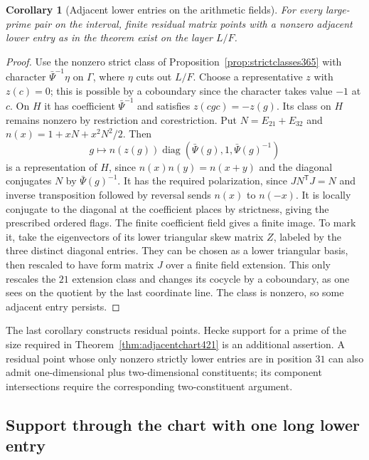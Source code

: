 \documentclass[a4paper,11pt]{article}
\newtheorem{corollary}[proposition]{Corollary}
\theoremstyle{definition}
\theoremstyle{remark}
\numberwithin{equation}{section}
\begin{document}
\begin{corollary}[Adjacent lower entries on the arithmetic fields]\leavevmode
\label{cor:lowerpoints421}
For every large-prime pair on the interval, finite residual
matrix points with a nonzero adjacent lower entry as in the
theorem exist on the layer \(L/F\).
\end{corollary}
\begin{proof}
Use the nonzero strict class of
Proposition~\ref{prop:strictclasses365} with character
\(\bar\Psi^{-1}\eta\) on \(\Gamma\), where \(\eta\) cuts out
\(L/F\). Choose a representative \(z\) with \(z(c)=0\);
this is possible by a coboundary since the character takes
value \(-1\) at \(c\). On \(H\) it has coefficient \(\bar\Psi^{-1}\)
and satisfies \(z(cgc)=-z(g)\). Its class on \(H\) remains
nonzero by restriction and corestriction. Put \(N=E_{21}+E_{32}\)
and \(n(x)=1+xN+x^2N^2/2\). Then
\[
   g\longmapsto n(z(g))\operatorname{diag}
               (\bar\Psi(g),1,\bar\Psi(g)^{-1})
\]
is a representation of \(H\), since \(n(x)n(y)=n(x+y)\) and
the diagonal conjugates \(N\) by \(\bar\Psi(g)^{-1}\).
It has the required polarization, since \(JN^{\mathsf T}J=N\)
and inverse transposition followed by reversal sends \(n(x)\)
to \(n(-x)\). It is locally conjugate to the diagonal at the
coefficient places by strictness, giving the prescribed ordered
flags. The finite coefficient field gives a finite image.
To mark it, take the eigenvectors of its lower triangular skew
matrix \(Z\), labeled by the three distinct diagonal entries.
They can be chosen as a lower triangular basis, then rescaled
to have form matrix \(J\) over a finite field extension. This
only rescales the \(21\) extension class and changes its cocycle
by a coboundary, as one sees on the quotient by the last coordinate
line. The class is nonzero, so some adjacent entry persists.
\end{proof}

The last corollary constructs residual points. Hecke support for
a prime of the size required in Theorem~\ref{thm:adjacentchart421}
is an additional assertion. A residual point whose only nonzero
strictly lower entries are in position \(31\) can also admit
one-dimensional plus two-dimensional constituents; its component
intersections require the corresponding two-constituent argument.


\subsection{Support through the chart with one long lower entry}
\label{sec:longrootcoverage422}
\end{document}
